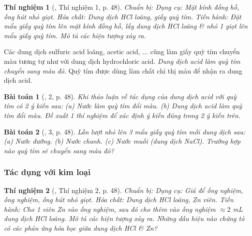 \documentclass{article}
\newtheorem{baitoan}{Bài toán}
\newtheorem{thinghiem}{Thí nghiệm}
\begin{document}
\begin{thinghiem}[\cite{SGK_KHTN_8_Canh_Dieu}, Thí nghiệm 1, p. 48]
	\emph{Chuẩn bị:} Dụng cụ: Mặt kính đồng hồ, ống hút nhỏ giọt. Hóa chất: Dung dịch \emph{HCl} loãng, giấy quỳ tím. \emph{Tiến hành:} Đặt mẩu giấy quỳ tím lên mặt kính đồng hồ, lấy dung dịch \emph{HCl} loãng \& nhỏ 1 giọt lên mẩu giấy quỳ tím. Mô tả các hiện tượng xảy ra.
\end{thinghiem}
Các dung dịch sulfuric acid loãng, acetic acid, $\ldots$ cũng làm giấy quỳ tím chuyển màu tương tự như với dung dịch hydrochloric acid. \textit{Dung dịch acid làm quỳ tím chuyển sang màu đỏ}. Quỳ tím được dùng làm chất chỉ thị màu để nhận ra dung dịch acid. 

\begin{baitoan}[\cite{SGK_KHTN_8_Canh_Dieu}, 2, p. 48]
	Khi thảo luận về tác dụng của dung dịch acid với quỳ tím có 2 ý kiến sau: (a) Nước làm quỳ tím đổi màu. (b) Dung dịch acid làm quỳ tím đổi màu. Đề xuất 1 thí nghiệm để xác định ý kiến đúng trong 2 ý kiến trên.
\end{baitoan}

\begin{baitoan}[\cite{SGK_KHTN_8_Canh_Dieu}, 3, p. 48]
	Lần lượt nhỏ lên 3 mẩu giấy quỳ tím mỗi dung dịch sau: (a) Nước đường. (b) Nước chanh. (c) Nước muối (dung dịch \emph{NaCl}). Trường hợp nào quỳ tím sẽ chuyển sang màu đỏ?
\end{baitoan}

\subsubsection{Tác dụng với kim loại}

\begin{thinghiem}[\cite{SGK_KHTN_8_Canh_Dieu}, Thí nghiệm 2, p. 48]
	\emph{Chuẩn bị:} Dụng cụ: Giá để ống nghiệm, ống nghiệm, ống hút nhỏ giọt. Hóa chất: Dung dịch \emph{HCl} loãng, \emph{Zn} viên. \emph{Tiến hành:} Cho 1 viên \emph{Zn} vào ống nghiệm, sau đó cho thêm vào ống nghiệm $\approx 2$ \emph{mL} dung dịch \emph{HCl} loãng. Mô tả các hiện tượng xảy ra. Những dấu hiệu nào chứng tỏ có các phản ứng hóa học giữa dung dịch \emph{HCl} \& \emph{Zn}?
\end{thinghiem}
\end{document}
